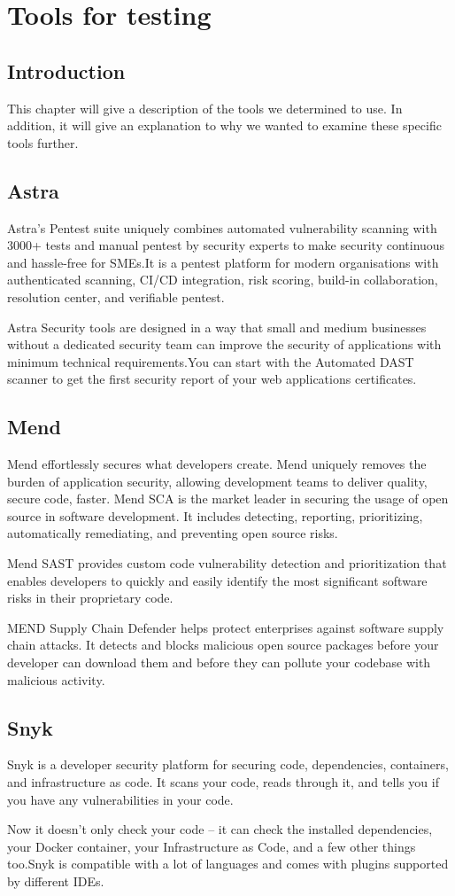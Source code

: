 \section{Tools for testing}
\subsection{Introduction}
This chapter will give a description of the tools we determined to use. In addition, it will give an explanation to why we wanted to examine these specific tools further. 
\subsection{Astra}
Astra's Pentest suite uniquely combines automated vulnerability scanning with 3000+ tests and manual pentest by security experts to make security continuous and hassle-free for SMEs.It is a pentest platform for modern organisations with authenticated scanning, CI/CD integration, risk scoring, build-in collaboration, resolution center, and verifiable pentest. 

Astra Security tools are designed in a way that small and medium businesses without a dedicated security team can improve the security of applications with minimum technical requirements.You can start with the Automated DAST scanner to get the first security report of your web applications
certificates.
\subsection{Mend}
Mend effortlessly secures what developers create. Mend uniquely removes the burden of application security, allowing development teams to deliver quality, secure code, faster. Mend SCA is the market leader in securing the usage of open source in software development. It includes detecting, reporting, prioritizing, automatically remediating, and preventing open source risks.

Mend SAST provides custom code vulnerability detection and prioritization that enables developers to quickly and easily identify the most significant software risks in their proprietary code.

MEND Supply Chain Defender helps protect enterprises against software supply chain attacks. It detects and blocks malicious open source packages before your developer can download them and before they can pollute your codebase with malicious activity.


\subsection{Snyk}
Snyk is a developer security platform for securing code, dependencies, containers, and infrastructure as code. It scans your code, reads through it, and tells you if you have any vulnerabilities in your code.

Now it doesn't only check your code – it can check the installed dependencies, your Docker container, your Infrastructure as Code, and a few other things too.Snyk is compatible with a lot of languages and comes with plugins supported by different IDEs.
